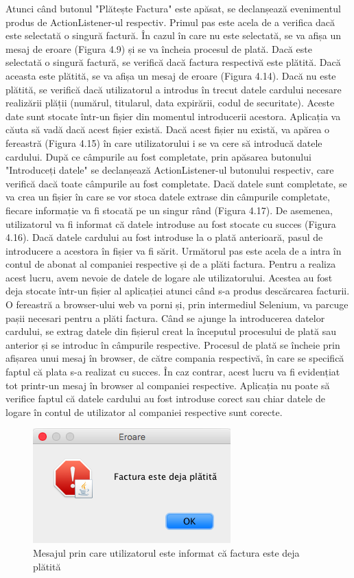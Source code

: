 \documentclass[12pt]{book}
\begin{document}
Atunci când butonul "Plătește Factura" este apăsat, se declanșează evenimentul produs de ActionListener-ul respectiv. Primul pas este acela de a verifica dacă este selectată o singură factură. În cazul în care nu este selectată, se va afișa un mesaj de eroare (Figura 4.9) și se va încheia procesul de plată. Dacă este selectată o singură factură, se verifică dacă factura respectivă este plătită. Dacă aceasta este plătită, se va afișa un mesaj de eroare (Figura 4.14). Dacă nu este plătită, se verifică dacă utilizatorul a introdus în trecut datele cardului necesare realizării plății (numărul, titularul, data expirării, codul de securitate). Aceste date sunt stocate într-un fișier din momentul introducerii acestora. Aplicația va căuta să vadă dacă acest fișier există. Dacă acest fișier nu există, va apărea o fereastră (Figura 4.15) în care utilizatorului i se va cere să introducă datele cardului. După ce câmpurile au fost completate, prin apăsarea butonului "Introduceți datele" se declanșează ActionListener-ul butonului respectiv, care verifică dacă toate câmpurile au fost completate. Dacă datele sunt completate, se va crea un fișier în care se vor stoca datele extrase din câmpurile completate, fiecare informație va fi stocată pe un singur rând (Figura 4.17). De asemenea, utilizatorul va fi informat că datele introduse au fost stocate cu succes (Figura 4.16). Dacă datele cardului au fost introduse la o plată anterioară, pasul de introducere a acestora în fișier va fi sărit. Următorul pas este acela de a intra în contul de abonat al companiei respective și de a plăti factura. Pentru a realiza acest lucru, avem nevoie de datele de logare ale utilizatorului. Acestea au fost deja stocate într-un fișier al aplicației atunci când s-a produs descărcarea facturii. O fereastră a browser-ului web va porni și, prin intermediul Selenium, va parcuge pașii necesari pentru a plăti factura. Când se ajunge la introducerea datelor cardului, se extrag datele din fișierul creat la începutul procesului de plată sau anterior și se introduc în câmpurile respective. Procesul de plată se încheie prin afișarea unui mesaj în browser, de către compania respectivă, în care se specifică faptul că plata s-a realizat cu succes. În caz contrar, acest lucru va fi evidențiat tot printr-un mesaj în browser al companiei respective. Aplicația nu poate să verifice faptul că datele cardului au fost introduse corect sau chiar datele de logare în contul de utilizator al companiei respective sunt corecte. 

\begin{figure}[!ht]
	\centering
	\includegraphics{FacturaPlatita}
	\caption{Mesajul prin care utilizatorul este informat că factura este deja plătită}
\end{figure}
\end{document}

